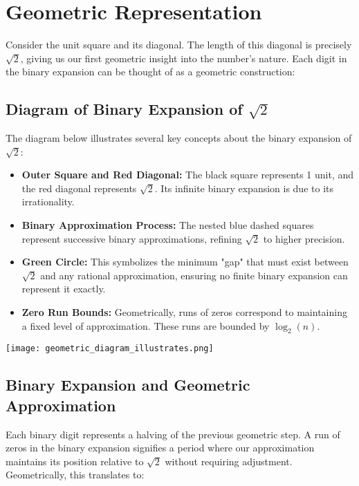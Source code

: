 \section{Geometric Representation}
Consider the unit square and its diagonal. The length of this diagonal is precisely $\sqrt{2}$, giving us our first geometric insight into the number's nature. Each digit in the binary expansion can be thought of as a geometric construction:

\subsection{Diagram of Binary Expansion of \texorpdfstring{$\sqrt{2}$}{sqrt(2)}}

The diagram below illustrates several key concepts about the binary expansion of $\sqrt{2}$:
\begin{itemize}
    \item \textbf{Outer Square and Red Diagonal:} The black square represents 1 unit, and the red diagonal represents $\sqrt{2}$. Its infinite binary expansion is due to its irrationality.
    \item \textbf{Binary Approximation Process:} The nested blue dashed squares represent successive binary approximations, refining $\sqrt{2}$ to higher precision.
    \item \textbf{Green Circle:} This symbolizes the minimum "gap" that must exist between $\sqrt{2}$ and any rational approximation, ensuring no finite binary expansion can represent it exactly.
    \item \textbf{Zero Run Bounds:} Geometrically, runs of zeros correspond to maintaining a fixed level of approximation. These runs are bounded by $\log_2(n)$.
\end{itemize}

\begin{center}
    \texttt{[image: geometric\_diagram\_illustrates.png]} %
\end{center}


\subsection{Binary Expansion and Geometric Approximation}
Each binary digit represents a halving of the previous geometric step. A run of zeros in the binary expansion signifies a period where our approximation maintains its position relative to $\sqrt{2}$ without requiring adjustment. Geometrically, this translates to:


